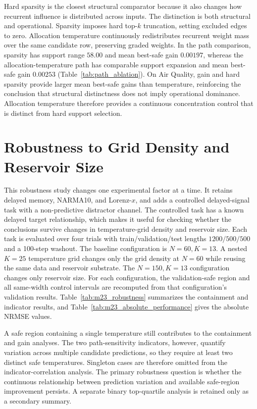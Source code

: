 \documentclass[preprint,12pt,authoryear]{elsarticle}
\begin{document}
Hard sparsity is the closest structural comparator because it also changes how recurrent influence is distributed across inputs. The distinction is both structural and operational. Sparsity imposes hard top-$k$ truncation, setting excluded edges to zero. Allocation temperature continuously redistributes recurrent weight mass over the same candidate row, preserving graded weights. In the path comparison, sparsity has support range $58.00$ and mean best-safe gain $0.00197$, whereas the allocation-temperature path has comparable support expansion and mean best-safe gain $0.00253$ (Table~\ref{tab:path_ablation}). On Air Quality, gain and hard sparsity provide larger mean best-safe gains than temperature, reinforcing the conclusion that structural distinctness does not imply operational dominance. Allocation temperature therefore provides a continuous concentration control that is distinct from hard support selection.


\section{Robustness to Grid Density and Reservoir Size}
\label{sec:grid_size_robustness}

This robustness study changes one experimental factor at a time. It retains delayed memory, NARMA10, and Lorenz-$x$, and adds a controlled delayed-signal task with a non-predictive distractor channel. The controlled task has a known delayed target relationship, which makes it useful for checking whether the conclusions survive changes in temperature-grid density and reservoir size. Each task is evaluated over four trials with train/validation/test lengths $1200/500/500$ and a 100-step washout. The baseline configuration is $N=60,K=13$. A nested $K=25$ temperature grid changes only the grid density at $N=60$ while reusing the same data and reservoir substrate. The $N=150,K=13$ configuration changes only reservoir size. For each configuration, the validation-safe region and all same-width control intervals are recomputed from that configuration's validation results. Table~\ref{tab:m23_robustness} summarizes the containment and indicator results, and Table~\ref{tab:m23_absolute_performance} gives the absolute NRMSE values.

A safe region containing a single temperature still contributes to the containment and gain analyses. The two path-sensitivity indicators, however, quantify variation across multiple candidate predictions, so they require at least two distinct safe temperatures. Singleton cases are therefore omitted from the indicator-correlation analysis. The primary robustness question is whether the continuous relationship between prediction variation and available safe-region improvement persists. A separate binary top-quartile analysis is retained only as a secondary summary.
\end{document}
